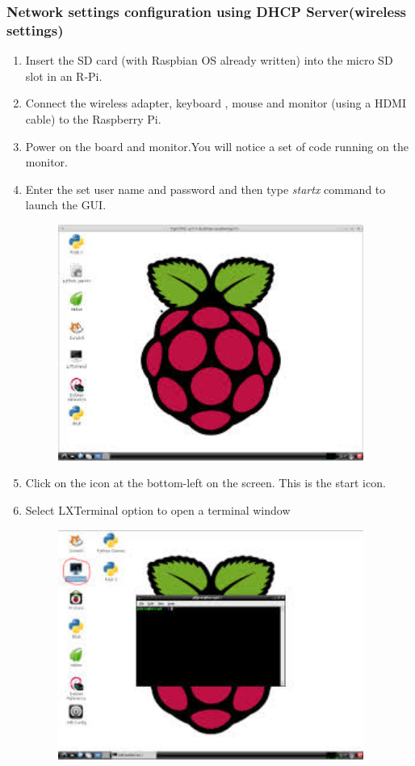 \documentclass[11pt,a4paper]{article}
\begin{document}
	\subsubsection{Network settings configuration using DHCP Server(wireless settings)} 
	\begin{enumerate}
		\item Insert the SD card (with Raspbian OS already written) into the micro SD slot in an R-Pi.
		\item Connect the wireless adapter, keyboard , mouse and monitor (using a HDMI cable) to the Raspberry Pi.
		\item Power on the board and monitor.You will notice a set of code running on the monitor.
		\item Enter the set user name and password and then type \textit{startx} command to launch the GUI.
		\begin{figure}[h!]
			\includegraphics[width=10cm]{r1.jpg}
			\centering
		\end{figure} 
		\item Click on the icon at the bottom-left on the screen. This is the start icon.
		\item Select LXTerminal option to open a terminal window
		\newpage
		\begin{figure}[h!]
			\includegraphics[width=10cm]{lxt.jpg}

\end{figure}
\end{enumerate}
\end{document}
